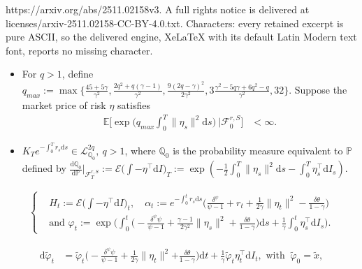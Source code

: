 \documentclass[10pt,a4paper]{amsart}
\begin{document}
https://arxiv.org/abs/2511.02158v3. A full rights notice is delivered at licenses/arxiv-2511.02158-CC-BY-4.0.txt. Characters: every retained excerpt is pure ASCII, so the delivered engine, XeLaTeX with its default Latin Modern text font, reports no missing character.
\begin{assum}\leavevmode\label{Change of measure}
	\begin{itemize}
		\item[$(i)$] For $q>1$, define $q_{max}:=\max\Big\{\frac{45+5\gamma}{\gamma^{2}},\frac{2q^{2}+q(\gamma-1)}{\gamma^{2}},\frac{9(2q-\gamma)^{2}}{2\gamma^{2}},3\frac{\gamma^{2}-5q\gamma+6q^{2}-q}{\gamma^{2}},32\Big\}$. Suppose the market price of risk $\eta$ satisfies
		\begin{align}
			\mathbb{E}\Big[\exp\Big(q_{max}\int_{0}^{T}\|\eta_{s}\|^{2}\mathrm{d}s\Big)~\big|\mathcal{F}_{0}^{r,S}\Big]&<\infty.
		\end{align}
		\item[$(ii)$]  $K_{T}e^{-\int_{0}^{T}r_{s}\mathrm{d}s}\in\mathcal{L}_{\mathbb{Q}_{0}}^{2q},~{q>1}$, where $\mathbb{Q}_{0}$ is the probability measure equivalent to $\mathbb{P}$ defined by $\frac{\mathrm{d}\mathbb{Q}_{0}}{\mathrm{d}\mathbb{P}}\big|_{\mathcal{F}_{T}^{r,S}}:=\mathcal{E}\big(\int-\eta^{\top}\mathrm{d}I\big)_{T}:=\exp\left(-\frac{1}{2}\int_{0}^{T}\|\eta_{s}\|^{2}\mathrm{d}s-\int_{0}^{T}\eta_{s}^{\top}\mathrm{d}I_{s} \right)$.
	\end{itemize}
\end{assum}

\begin{align}\label{Auxiliary processes}
	\begin{cases}
		&H_{t}:=\mathcal{E}\big(\int-\eta^{\top}\mathrm{d}I\big)_{t},\quad\alpha_{t}:=e^{-\int_{0}^{t}r_{s}\mathrm{d}s}\Big(\frac{\delta^{\psi}}{\psi-1}+r_{t}+\frac{1}{2\gamma}\|\eta_{t}\|^{2}-\frac{\delta\theta}{1-\gamma}\Big)\\
		&\text{and }\varphi_{t}:=\exp\Big(\int_{0}^{t}\Big(-\frac{\delta^{\psi}\psi} {\psi-1}+\frac{\gamma-1}{2\gamma^{2}}\|\eta_{s}\|^{2}+\frac{\delta\theta}{1-\gamma}\Big)\mathrm{d}s+\frac{1}{\gamma}\int_{0}^{t}\eta_{s}^{\top}\mathrm{d}I_{s}\Big).
	\end{cases}
\end{align}

	\begin{align}\label{Dynamics of the auxiliary process_1.0}
		\mathrm{d}\widetilde{\varphi}_{t}&=\widetilde{\varphi}_{t}\Big(-\frac{\delta^{\psi}\psi}{\psi-1}+\frac{1}{2\gamma}\|\eta_{t}\|^{2}{+\frac{\delta\theta}{1-\gamma}}\Big)\mathrm{d}t+\frac{1}{\gamma}\widetilde{\varphi}_{t}\eta_{t}^{\top}\mathrm{d}I_{t},\text{ with }~\widetilde{\varphi}_{0}=\widetilde{x},
	\end{align}
\end{document}
